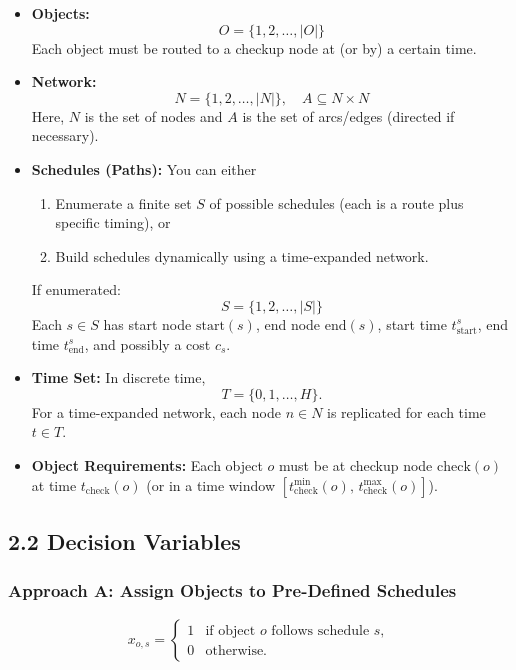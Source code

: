 \begin{itemize}
  \item \textbf{Objects:}
  \[
    O = \{1,2,\dots,|O|\}
  \]
  Each object must be routed to a checkup node at (or by) a certain time.

  \item \textbf{Network:}
  \[
    N = \{1,2,\dots,|N|\}, 
    \quad
    A \subseteq N \times N
  \]
  Here, $N$ is the set of nodes and $A$ is the set of arcs/edges (directed if necessary).

  \item \textbf{Schedules (Paths):} You can either
  \begin{enumerate}
    \item Enumerate a finite set $S$ of possible schedules (each is a route plus specific timing), or
    \item Build schedules dynamically using a time-expanded network.
  \end{enumerate}
  If enumerated:
  \[
    S = \{1, 2, \dots, |S|\}
  \]
  Each $s \in S$ has start node $\mathrm{start}(s)$, end node $\mathrm{end}(s)$, start time $t_{\text{start}}^s$, end time $t_{\text{end}}^s$, and possibly a cost $c_s$.

  \item \textbf{Time Set:} In discrete time,
  \[
    T = \{0,1,\dots,H\}.
  \]
  For a time-expanded network, each node $n \in N$ is replicated for each time $t \in T$.

  \item \textbf{Object Requirements:} Each object $o$ must be at checkup node $\mathrm{check}(o)$ at time $t_{\mathrm{check}}(o)$ (or in a time window $[t_{\mathrm{check}}^{\min}(o),\, t_{\mathrm{check}}^{\max}(o)]$).
\end{itemize}

\subsection*{2.2 Decision Variables}

\subsubsection*{Approach A: Assign Objects to Pre-Defined Schedules}

\[
  x_{o,s} = 
  \begin{cases} 
      1 & \text{if object $o$ follows schedule $s$}, \\
      0 & \text{otherwise.}
  \end{cases}
\]

